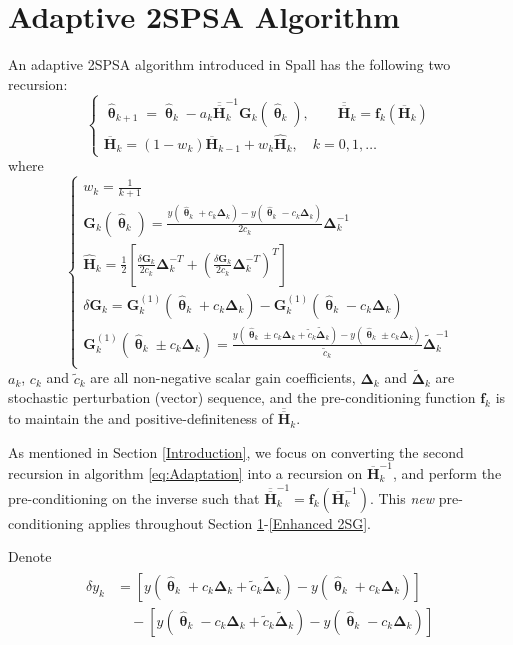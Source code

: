 \documentclass[conference]{IEEEtran}
\newcommand{\bG}{\bm{G}}
\newcommand{\bDelta}{\bm{\Delta}}
\newcommand{\oH}{\bm{\overline{H}}}
\newcommand{\ooH}{\bm{\overline{\overline{H}}}}
\newcommand{\hH}{\bm{\hat{H}}}
\newcommand{\htheta}{\bm{\hat{\uptheta}}}
\newcommand{\tDelta}{\bm{\tilde{\Delta}}}
\begin{document}
\section{Adaptive 2SPSA Algorithm} \label{2SPSA}
An adaptive 2SPSA algorithm introduced in Spall \cite{Spall2000} has the following two recursion:
\begin{equation} \label{eq:Adaptation}
\begin{cases}
\htheta_{k+1}=\htheta_k-a_k\ooH_k^{-1} \bG_k(\htheta_k),\qquad \bm{\ooH}_k=\bm{f}_k(\oH_k)\\
\oH_k= (1 - w_k) \oH_{k-1}+ w_k \hH_k, \quad k=0,1,\dots
\end{cases}
\end{equation}
where
\begin{equation} \label{eq:notations}
\begin{cases}
w_k=\frac{1}{k+1}\\
\bG_k(\htheta_k)=\frac{y(\htheta_k+c_k\bDelta_k)-y(\htheta_k-c_k\bDelta_k)}{2c_k}\bDelta_k^{-1}\\
\hH_k=\frac{1}{2}\left[ \frac{\delta\bG_k}{2c_k}\bDelta_k^{-T}+\left(\frac{\delta\bG_k}{2c_k}\bDelta_k^{-T}\right)^T \right]\\
\delta\bG_k=\bG_k^{(1)}(\htheta_k+ c_k\bDelta_k)-\bG_k^{(1)}(\htheta_k- c_k\bDelta_k)\\
\bG_k^{(1)}(\htheta_k\pm c_k\bDelta_k)
=\frac{y(\htheta_k\pm c_k\bDelta_k+\tilde{c}_k\tDelta_k)-y(\htheta_k\pm c_k\bDelta_k)}{\tilde{c}_k}\tDelta_k^{-1}\\
\end{cases}
\end{equation}
$ a_k $, $ c_k $ and $ \tilde{c}_k $ are all non-negative scalar gain coefficients, $ \bDelta_k $ and $ \tDelta_k $ are stochastic perturbation (vector) sequence, and the pre-conditioning function $ \bm{f}_k $ is to maintain the and positive-definiteness of $ \ooH_k $.

As mentioned in Section \ref{Introduction}, we focus on converting the second recursion in algorithm \ref{eq:Adaptation} into a recursion on $\oH_k^{-1}$, and perform the pre-conditioning on the inverse such that $\bm{\ooH}_k^{-1}=\bm{f}_k(\oH_k^{-1})$. This \textit{new} pre-conditioning applies throughout Section \ref{2SPSA}-\ref{Enhanced 2SG}.

Denote
\begin{align} \label{eq:dy}
\begin{split}
\delta y_k&=[y(\htheta_k+c_k\bDelta_k+\tilde{c}_k\tDelta_k)-y(\htheta_k+c_k\bDelta_k)]\\
&\quad-[y(\htheta_k-c_k\bDelta_k+\tilde{c}_k\tDelta_k)-y(\htheta_k-c_k\bDelta_k)]
\end{split}
\end{align}
\end{document}
